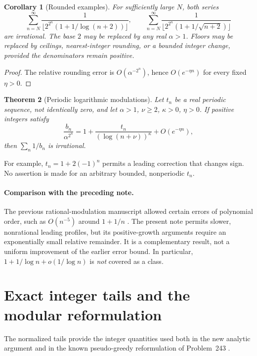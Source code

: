 \documentclass[11pt,a4paper]{article}
\newtheorem{theorem}{Theorem}[section]
\newtheorem{corollary}[theorem]{Corollary}
\theoremstyle{remark}\newtheorem{remark}[theorem]{Remark}
\begin{document}
\begin{corollary}[Rounded examples]\label{cor:rounded}
For sufficiently large $N$, both series
\[
 \sum_{n=N}^{\infty}\frac1{\lfloor 2^{2^n}(1+1/\log(n+2))\rfloor},
 \qquad
 \sum_{n=N}^{\infty}\frac1{\lfloor 2^{2^n}(1+1/\sqrt{n+2})\rfloor}
\]
are irrational. The base $2$ may be replaced by any real $\alpha>1$.
Floors may be replaced by ceilings, nearest-integer rounding, or a bounded
integer change, provided the denominators remain positive.
\end{corollary}
\begin{proof}
The relative rounding error is $O(\alpha^{-2^n})$, hence
$O(e^{-\eta n})$ for every fixed $\eta>0$.
\end{proof}

\begin{theorem}[Periodic logarithmic modulations]\label{thm:periodic}
Let $t_n$ be a real periodic sequence, not identically zero, and let
$\alpha>1$, $\nu\ge2$, $\kappa>0$, $\eta>0$. If positive integers satisfy
\[
 \frac{b_n}{\alpha^{2^n}}
   =1+\frac{t_n}{(\log(n+\nu))^\kappa}+O(e^{-\eta n}),
\]
then $\sum_n1/b_n$ is irrational.
\end{theorem}
For example, $t_n=1+2(-1)^n$ permits a leading correction that changes sign.
No assertion is made for an arbitrary bounded, nonperiodic $t_n$.

\paragraph{Comparison with the preceding note.}
The previous rational-modulation manuscript allowed certain errors of
polynomial order, such as $O(n^{-5})$ around $1+1/n$ \cite{previous}.
The present note permits slower, nonrational leading profiles, but its
positive-growth arguments require an exponentially small relative remainder.
It is a complementary result, not a uniform improvement of the earlier error
bound. In particular, $1+1/\log n+o(1/\log n)$ is \emph{not} covered as a class.

\section{Exact integer tails and the modular reformulation}
The normalized tails provide the integer quantities used both in the new
analytic argument and in the known pseudo-greedy reformulation of
Problem~243 \cite{koizumi}.
\end{document}
